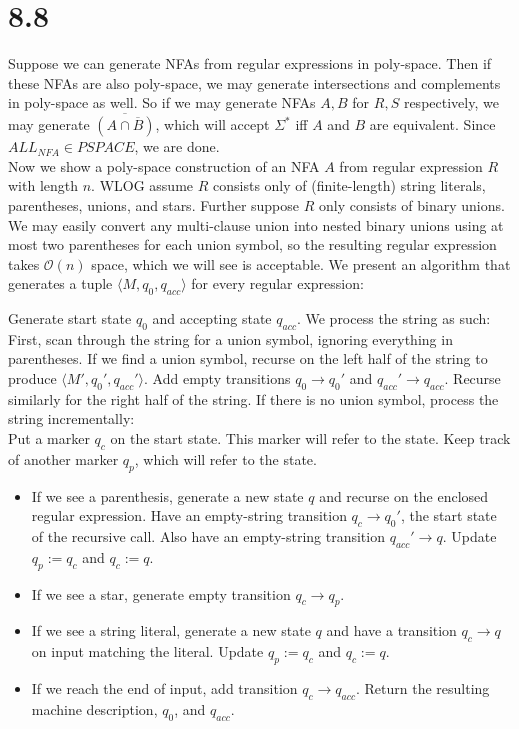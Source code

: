 \documentclass{article}
\newenvironment{myindentpar}[1]
  {\begin{list}{}
          {\setlength{\leftmargin}{#1}
          \setlength{\rightmargin}{#1}}
          \item[]
  }
  {\end{list}}
\begin{document}
\section*{8.8}
Suppose we can generate NFAs from regular expressions in poly-space. Then if these NFAs are also poly-space, we may generate intersections and complements in poly-space as well. So if we may generate NFAs $A,B$ for $R,S$ respectively, we may generate $\overline{(A \cap \overline{B})}$, which will accept $\Sigma^*$ iff $A$ and $B$ are equivalent. Since $ALL_{NFA} \in PSPACE$, we are done.\\
Now we show a poly-space construction of an NFA $A$ from regular expression $R$ with length $n$. WLOG assume $R$ consists only of (finite-length) string literals, parentheses, unions, and stars. Further suppose $R$ only consists of binary unions. We may easily convert any multi-clause union into nested binary unions using at most two parentheses for each union symbol, so the resulting regular expression takes $\mathcal{O}(n)$ space, which we will see is acceptable. We present an algorithm that generates a tuple $\langle M, q_0, q_{acc} \rangle$ for every regular expression:
\begin{myindentpar}{1em}
Generate start state $q_0$ and accepting state $q_{acc}$. We process the string as such:\\
First, scan through the string for a union symbol, ignoring everything in parentheses. If we find a union symbol, recurse on the left half of the string to produce $\langle M',q_0', q_{acc}' \rangle$. Add empty transitions $q_0 \to q_0'$ and $q_{acc}' \to q_{acc}$. Recurse similarly for the right half of the string. If there is no union symbol, process the string incrementally:\\
Put a marker $q_c$ on the start state. This marker will refer to the  state. Keep track of another marker $q_p$, which will refer to the  state.
\begin{itemize}
\item If we see a parenthesis, generate a new state $q$ and recurse on the enclosed regular expression. Have an empty-string transition $q_c \to q_0'$, the start state of the recursive call. Also have an empty-string transition $q_{acc}' \to q$. Update $q_p := q_c$ and $q_c := q$.
\item If we see a star, generate empty transition $q_c \to q_p$.
\item If we see a string literal, generate a new state $q$ and have a transition $q_c \to q$ on input matching the literal. Update $q_p := q_c$ and $q_c := q$.
\item If we reach the end of input, add transition $q_c \to q_{acc}$. Return the resulting machine description, $q_0$, and $q_{acc}$.
\end{itemize}
\end{myindentpar}
\end{document}
